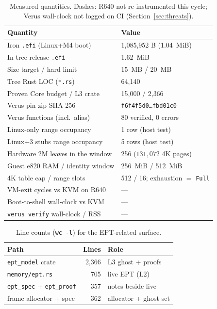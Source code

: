 \documentclass[sigplan,10pt,anonymous]{acmart}
\begin{document}
\begin{table}[t]
  \caption{Measured quantities. Dashes: R640 not re-instrumented this
  cycle; Verus wall-clock not logged on CI (Section~\ref{sec:threats}).}
  \label{tab:measure}
  \small
  \begin{tabularx}{\linewidth}{@{}L L@{}}
    \toprule
    Quantity & Value \\
    \midrule
    Iron \texttt{.efi} (Linux+M4 boot) & 1{,}085{,}952 B (1.04~MiB) \\
    In-tree release \texttt{.efi} & 1.62~MiB \\
    Size target / hard limit & 15~MB / 20~MB \\
    Tree Rust LOC (\texttt{*.rs}) & 64{,}140 \\
    Proven Core budget / L3 crate & 15{,}000 / 2{,}366 \\
    Verus pin zip SHA-256 & \texttt{f6f4f5d0\ldots fbd01c0} \\
    Verus functions (incl.\ alias) & 80 verified, 0 errors \\
    Linux-only range occupancy & 1 row (host test) \\
    Linux+3 stubs range occupancy & 5 rows (host test) \\
    Hardware 2M leaves in the window & 256 ($131{,}072$ 4K pages) \\
    Guest e820 RAM / identity window & 256~MiB / 512~MiB \\
    4K table cap / range slots & 512 / 16; exhaustion $=$ \texttt{Full} \\
    VM-exit cycles vs KVM on R640 & --- \\
    Boot-to-shell wall-clock vs KVM & --- \\
    \texttt{verus verify} wall-clock / RSS & --- \\
    \bottomrule
  \end{tabularx}
\end{table}

\begin{table}[t]
  \caption{Line counts (\texttt{wc -l}) for the EPT-related surface.}
  \label{tab:loc}
  \small
  \begin{tabularx}{\linewidth}{@{}L r L@{}}
    \toprule
    Path & Lines & Role \\
    \midrule
    \texttt{ept\_model} crate & 2{,}366 & L3 ghost + proofs \\
    \texttt{memory/ept.rs} & 705 & live EPT (L2) \\
    \texttt{ept\_spec} + \texttt{ept\_proof} & 357 & notes beside live \\
    frame allocator + spec & 362 & allocator + ghost set \\
    \bottomrule
  \end{tabularx}
\end{table}
\end{document}
